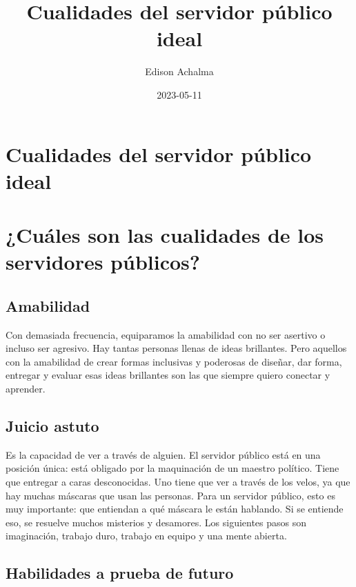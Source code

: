 \documentclass[
  jou,
  floatsintext,
  longtable,
  a4paper,
  nolmodern,
  notxfonts,
  notimes,
  12pt,
  colorlinks=true,linkcolor=blue,citecolor=blue,urlcolor=blue]{apa7}
\title{Cualidades del servidor público ideal}
\author{Edison Achalma}
\affiliation{
{Escuela Profesional de Economía, Universidad Nacional de San Cristóbal
de Huamanga}}
\date{2023-05-11}
\begin{document}
\maketitle


\hypertarget{toc}{}
\tableofcontents
\newpage
\section[Introduction]{Cualidades del servidor público ideal}

\setcounter{secnumdepth}{3}

\setlength\LTleft{0pt}




\section{¿Cuáles son las cualidades de los servidores
públicos?}\label{cuuxe1les-son-las-cualidades-de-los-servidores-puxfablicos}

\subsection{Amabilidad}\label{amabilidad}

Con demasiada frecuencia, equiparamos la amabilidad con no ser asertivo
o incluso ser agresivo. Hay tantas personas llenas de ideas brillantes.
Pero aquellos con la amabilidad de crear formas inclusivas y poderosas
de diseñar, dar forma, entregar y evaluar esas ideas brillantes son las
que siempre quiero conectar y aprender.

\subsection{Juicio astuto}\label{juicio-astuto}

Es la capacidad de ver a través de alguien. El servidor público está en
una posición única: está obligado por la maquinación de un maestro
político. Tiene que entregar a caras desconocidas. Uno tiene que ver a
través de los velos, ya que hay muchas máscaras que usan las personas.
Para un servidor público, esto es muy importante: que entiendan a qué
máscara le están hablando. Si se entiende eso, se resuelve muchos
misterios y desamores. Los siguientes pasos son imaginación, trabajo
duro, trabajo en equipo y una mente abierta.

\subsection{Habilidades a prueba de
futuro}\label{habilidades-a-prueba-de-futuro}
\end{document}
